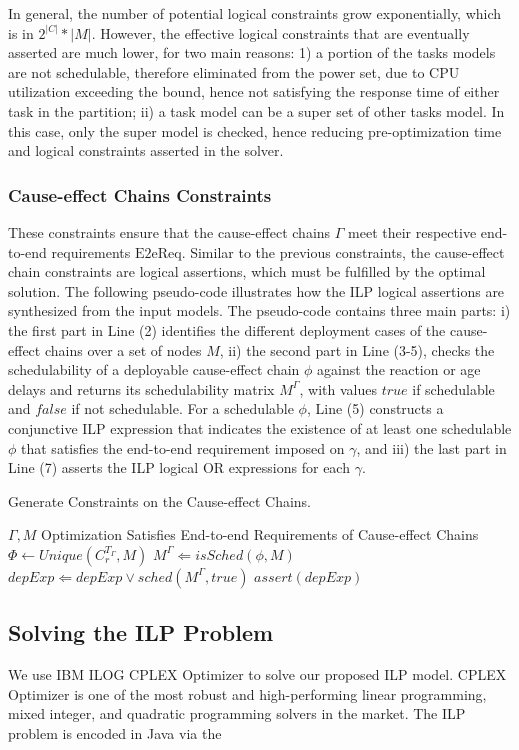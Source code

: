 In general, the number of potential logical constraints grow exponentially, which is in $2^{|C|}*|M|$. However, the effective logical constraints that are eventually asserted are much lower, for two main reasons: 1) a portion of the tasks models are not schedulable, therefore eliminated from the power set, due to CPU utilization exceeding the bound, hence not satisfying the response time of either task in the partition; ii) a task model can be a super set of other tasks model. In this case, only the super model is checked, hence reducing pre-optimization time and logical constraints asserted in the solver.

\subsubsection*{Cause-effect Chains Constraints}
These constraints ensure that the cause-effect chains $\Gamma$ meet their respective end-to-end requirements $\mathrm{E2eReq}$. Similar to the previous constraints, the cause-effect chain constraints are logical assertions, which must be fulfilled by the optimal solution. The following pseudo-code illustrates how the ILP logical assertions are synthesized from the input models. 
The pseudo-code contains three main parts: i) the first part in Line (2) identifies the different deployment cases of the cause-effect chains over a set of nodes $M$, ii) the second part in Line (3-5), checks the schedulability of a deployable cause-effect chain $\phi$ against the reaction or age delays  \cite{mubeen2013support} and returns its schedulability matrix $M^\Gamma$, with values $true$ if schedulable and $false$ if not schedulable. For a schedulable $\phi$, Line (5) constructs a conjunctive ILP expression that indicates the existence of at least one schedulable $\phi$ that satisfies the end-to-end requirement imposed on $\gamma$, and iii) the last part in Line (7) asserts the ILP logical OR expressions for each $\gamma$.
\begin{algorithm}
\caption{Generate Constraints on the Cause-effect Chains.}\label{alg_causeeffectchains}
\begin{algorithmic}[1]
\Require $\Gamma,M$
\Ensure Optimization Satisfies End-to-end Requirements of Cause-effect Chains
\ForAll{$\gamma \in \Gamma$}
\State $\Phi\leftarrow Unique(C^{T_\Gamma}_r, M)$ 
	\ForAll{$\phi \in \Phi$}
    \State $M^\Gamma\Leftarrow isSched(\phi, M)$
    \State $depExp\Leftarrow depExp \lor sched(M^\Gamma, true)$
    \EndFor
	\State $assert(depExp)$
\EndFor
\end{algorithmic}
\end{algorithm}\vspace{-0.2cm}

\subsection{Solving the ILP Problem}
We use IBM ILOG CPLEX Optimizer to solve our proposed ILP model. CPLEX Optimizer is one of the most robust and high-performing linear programming, mixed integer, and quadratic programming solvers in the market. The ILP problem is encoded in Java via the 
